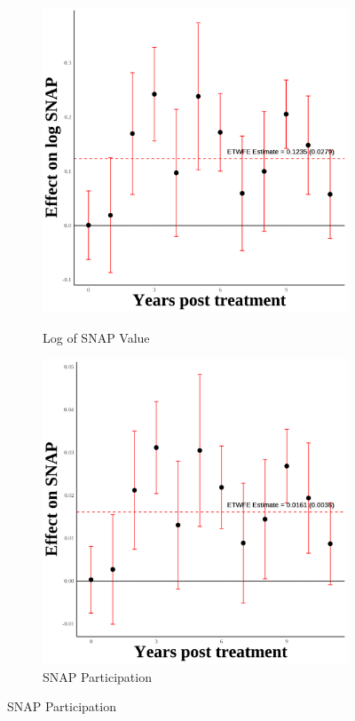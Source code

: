 \documentclass[12pt,english]{article}
\begin{document}
\begin{figure}[H]
  \begin{subfigure}[b]{0.3\textwidth}
    \centering
    \caption{Log of SNAP Value}
    \includegraphics[width=\linewidth]{figures/plot12-ln_snap_event_study-first.png}
    \label{fig:ln-snap-first}
  \end{subfigure}
  \hfill
  \begin{subfigure}[b]{0.3\textwidth}
    \centering
    \caption{SNAP Participation}
    \includegraphics[width=\linewidth]{figures/plot13-snap_event_study-first.png}

\end{subfigure}
\end{figure}
\end{document}

